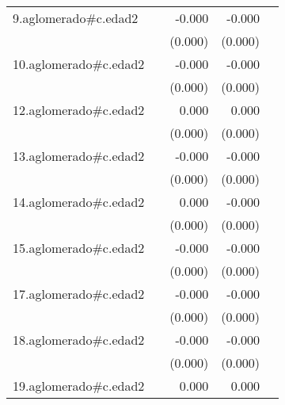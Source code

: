 {\begin{longtable}{l*{4}{D{.}{.}{-1}}}
\addlinespace
9.aglomerado#c.edad2&                     &      -0.000         &      -0.000\sym{**} &                     \\
            &                     &     (0.000)         &     (0.000)         &                     \\
\addlinespace
10.aglomerado#c.edad2&                     &      -0.000         &      -0.000         &                     \\
            &                     &     (0.000)         &     (0.000)         &                     \\
\addlinespace
12.aglomerado#c.edad2&                     &       0.000         &       0.000         &                     \\
            &                     &     (0.000)         &     (0.000)         &                     \\
\addlinespace
13.aglomerado#c.edad2&                     &      -0.000         &      -0.000\sym{*}  &                     \\
            &                     &     (0.000)         &     (0.000)         &                     \\
\addlinespace
14.aglomerado#c.edad2&                     &       0.000         &      -0.000         &                     \\
            &                     &     (0.000)         &     (0.000)         &                     \\
\addlinespace
15.aglomerado#c.edad2&                     &      -0.000         &      -0.000         &                     \\
            &                     &     (0.000)         &     (0.000)         &                     \\
\addlinespace
17.aglomerado#c.edad2&                     &      -0.000         &      -0.000\sym{*}  &                     \\
            &                     &     (0.000)         &     (0.000)         &                     \\
\addlinespace
18.aglomerado#c.edad2&                     &      -0.000         &      -0.000         &                     \\
            &                     &     (0.000)         &     (0.000)         &                     \\
\addlinespace
19.aglomerado#c.edad2&                     &       0.000         &       0.000\sym{**} &                     \\

\end{longtable}}
